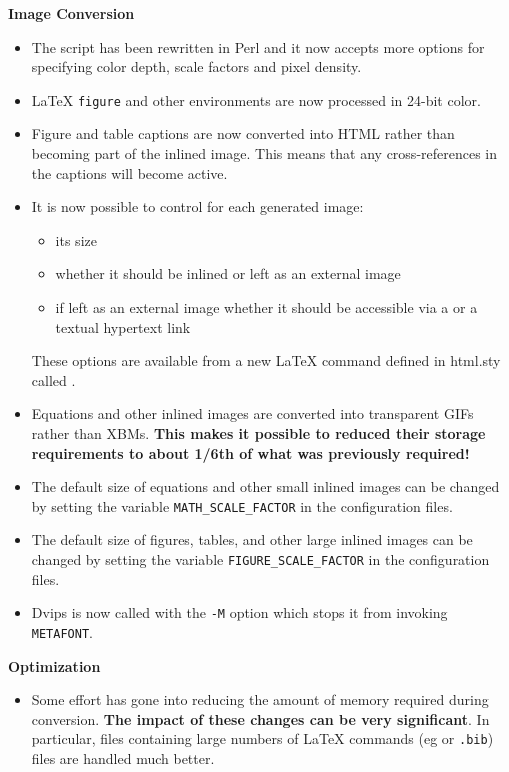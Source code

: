 \begin{htmllist}
\item[\textbf{Image Conversion}] \hfill
\begin{itemize}
\item The  script has been rewritten in Perl and it
now accepts more options for specifying color depth, scale factors
and pixel density.
\item LaTeX \texttt{figure} and other environments are now processed
in 24-bit color.
\item Figure and table captions are now converted into HTML
rather than becoming part of the inlined image. This means that 
any cross-references in the captions will become active.
\item It is now possible to control for each generated image:
\begin{itemize}
\item its size 
\item whether it should be inlined or left as an external image
\item if left as an external image whether it should be accessible
via a 
or a textual hypertext link
\end{itemize}
These options are available from a new LaTeX command defined in {\fn
html.sty} called . 

\item Equations and other inlined images are converted into
transparent GIFs rather than XBMs. \textbf{This makes it possible 
to reduced their storage requirements to about 1/6th of what was
previously required!}
\item The default size of equations and other small inlined 
images can be changed
by setting the variable \texttt{MATH\_SCALE\_FACTOR} in the
configuration files.
\item The default size of figures, tables, and other large
inlined images can be changed by setting the variable 
\texttt{FIGURE\_SCALE\_FACTOR} in the
configuration files.

\item Dvips is now called with the \texttt{-M} option which stops it
from invoking \texttt{METAFONT}.
\end{itemize}

\item[\textbf{Optimization}] \hfill
\begin{itemize}
\item Some effort has gone into reducing the amount of memory required
during conversion. \textbf{The impact of these changes can be very
significant}.
In particular, files
containing large numbers of LaTeX commands (eg  or \texttt{.bib}) 
files are handled much better.
\end{itemize}


\end{htmllist}
